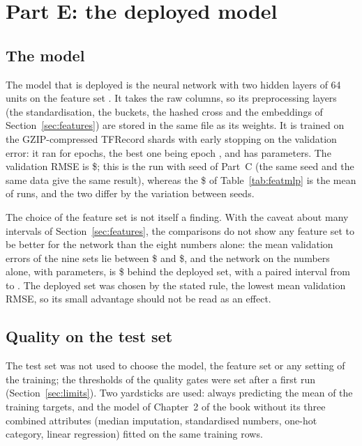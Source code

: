 \section{Part E: the deployed model}
\label{sec:model}

\subsection{The model}

The model that is deployed is the neural network with two hidden layers of 64 units on the feature set \texttt{}. It takes the raw columns, so its preprocessing layers (the standardisation, the buckets, the hashed cross and the embeddings of Section~\ref{sec:features}) are stored in the same file as its weights. It is trained on the GZIP-compressed TFRecord shards with early stopping on the validation error: it ran for  epochs, the best one being epoch , and has  parameters. The validation RMSE is \$; this is the run with seed  of Part~C (the same seed and the same data give the same result), whereas the \$ of Table~\ref{tab:featmlp} is the mean of  runs, and the two differ by the variation between seeds.

The choice of the feature set is not itself a finding. With the caveat about many intervals of Section~\ref{sec:features}, the comparisons do not show any feature set to be better for the network than the eight numbers alone: the mean validation errors of the nine sets lie between \$ and \$, and the network on the numbers alone, with  parameters, is \$ behind the deployed set, with a paired interval from  to . The deployed set was chosen by the stated rule, the lowest mean validation RMSE, so its small advantage should not be read as an effect.

\subsection{Quality on the test set}

The test set was not used to choose the model, the feature set or any setting of the training; the thresholds of the quality gates were set after a first run (Section~\ref{sec:limits}). Two yardsticks are used: always predicting the mean of the training targets, and the model of Chapter~2 of the book without its three combined attributes (median imputation, standardised numbers, one-hot category, linear regression) fitted on the same training rows.

